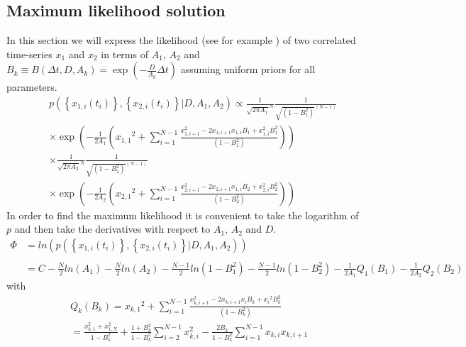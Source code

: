 \documentclass[%
 reprint,
 amsmath,amssymb,
 aps,
]{revtex4-1}
\begin{document}
\subsection{Maximum likelihood solution}
In this section we will express the likelihood (see for example \cite{RN42}) of two correlated time-series $x_1$ and $x_2$ in terms of $A_{1}$, $A_{2}$ and $B_{k}\equiv B(\Delta t,D,A_{k})=\exp\left(-\frac{D}{A_{k}}\Delta t\right)$ assuming uniform priors for all parameters.
\begin{eqnarray}
	&&p\left( \left\{x_{1,i}(t_i)\right\},\left\{x_{2,i}(t_i)\right\} \left| D, A_{1},A_{2} \right.\right) \propto
	\frac{1}{\sqrt {2 \pi A_{1}}^{N} }
	\frac{1}{{\sqrt {(1-B_{1}^{2})}^{(N-1)} }}\\
	&&\times\exp \left( -\frac{1}{2A_{1}}\left( {x_{1,1}}^{2} + 
	\sum\limits_{i=1}^{N-1}\frac{ x_{1,i+1}^{2} - 2x_{1,i+1}x_{1,i}B_{1} +x_{1,i}^{2}B_{1}^{2} }{(1-B_{1}^{2})} \right)\right)\nonumber\\
	&&\times\frac{1}{\sqrt {2 \pi A_{2}}^{N} }
	\frac{1}{{\sqrt {(1-B_{2}^{2})}^{(N-1)} }}\\
	&&\times\exp \left( -\frac{1}{2A_{2}}\left( {x_{2,1}}^{2} + 
	\sum\limits_{i=1}^{N-1}\frac{ x_{2,i+1}^{2} - 2x_{2,i+1}x_{1,i}B_{2} +x_{2,i}^{2}B_{2}^{2} }{(1-B_{2}^{2})} \right)\right)\nonumber
\end{eqnarray}
In order to find the maximum likelihood it is convenient to take the logarithm of $p$ and then take the derivatives with respect to $A_{1}$, $A_{2}$ and $D$.
\begin{equation}
\begin{aligned}
	\Phi &= ln \left( p\left( \left\{x_{1,i}(t_i)\right\},\left\{x_{2,i}(t_i)\right\} \left|  D, A_{1},A_{2} \right.\right) \right)\\\\
	&= C - \frac{N}{2} ln(A_{1}) - \frac{N}{2} ln(A_{2})- \frac{N-1}{2}ln \left( 1-B_{1}^{2}\right) - \frac{N-1}{2}ln \left( 1-B_{2}^{2}\right) -\frac{1}{2A_{1}}Q_{1}(B_{1})-\frac{1}{2A_{2}}Q_{2}(B_{2})
\end{aligned}
\end{equation}
with\begin{equation}
	\begin{aligned}
	&Q_{k}(B_{k}) = {x_{k,1}}^{2} + \sum\limits_{i=1}^{N-1}\frac{ {x_{k,i+1}^{2} - 2x_{k,i+1}{x_i}B_{k}} +{x_i}^{2}B_{k}^{2} }{(1-B_{k}^{2})}\\
	&= \frac{x_{k,1}^{2}+x_{1,N}^{2}}{1-B_{k}^2}+\frac{1+B_{k}^2}{1-B_{k}^2}\sum\limits_{i=2}^{N-1}x_{k,i}^{2}-\frac{2B_{k}}{1-B_{k}^2}\sum\limits_{i=1}^{N-1}x_{k,i}x_{k,i+1}
	\end{aligned}
\end{equation}
\end{document}
